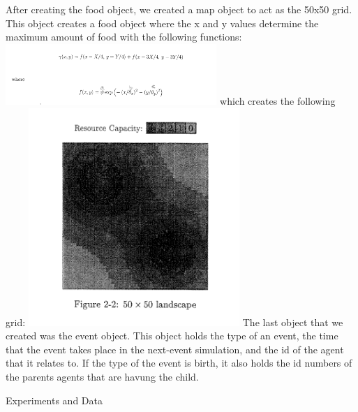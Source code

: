 \documentclass[11pt]{article}
\begin{document}
\begin{multicols}{2}
After creating the food object, we created a map object to act as the 50x50 grid. This object creates a food object where the x and y values determine the maximum amount of food with the following functions: \newline
\includegraphics[width=80mm]{MaxFoodFunction.PNG} \newline
which creates the following grid: \newline
\includegraphics[width=80mm]{ResourceCapacity.PNG} \newline
\newline
The last object that we created was the event object. This object holds the type of an event, the time that the event takes place in the next-event simulation, and the id of the agent that it relates to. If the type of the event is birth, it also holds the id numbers of the parents agents that are havung the child.
\newline
\newline

\center 
Experiments and Data
\flushleft


\end{multicols}
\end{document}
